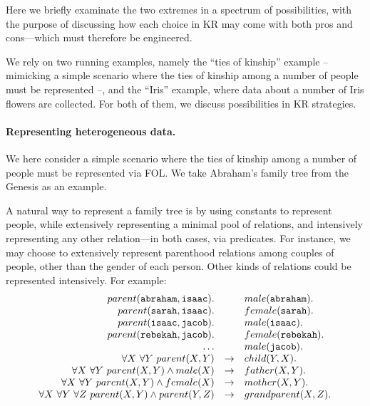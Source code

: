 \documentclass[12pt,a4paper,openright,twoside]{book}
\begin{document}
Here we briefly examinate the two extremes in a spectrum of possibilities, with the purpose of discussing how each choice in KR may come with both pros and cons---which must therefore be engineered.

We rely on two running examples, namely the ``ties of kinship'' example -- mimicking a simple scenario where the ties of kinship among a number of people must be represented --, and the ``Iris'' example, where data about a number of Iris flowers are collected.
%
For both of them, we discuss possibilities in KR strategies.

\paragraph{Representing heterogeneous data.}

We here consider a simple scenario where the ties of kinship among a number of people must be represented via FOL.
%
We take Abraham's family tree from the Genesis as an example.

A natural way to represent a family tree is by using constants to represent people, while extensively representing a minimal pool of relations, and intensively representing any other relation---in both cases, via predicates.
%
For instance, we may choose to extensively represent parenthood relations among couples of people, other than the gender of each person.
%
Other kinds of relations could be represented intensively.
%
For example:
%
\begin{equation}
    \begin{array}{rcl}
        parent(\mathtt{abraham}, \mathtt{isaac}). & {} & male(\mathtt{abraham}).
        \\
        parent(\mathtt{sarah}, \mathtt{isaac}). & {} & female(\mathtt{sarah}).
        \\
        parent(\mathtt{isaac}, \mathtt{jacob}). & {} & male(\mathtt{isaac}).
        \\
        parent(\mathtt{rebekah}, \mathtt{jacob}). & {} & female(\mathtt{rebekah}).
        \\
        \ldots & {} & male(\mathtt{jacob}).
        \\
        \forall X ~ \forall Y\ parent(X, Y) & \rightarrow & child(Y, X).  
        \\
        \forall X ~ \forall Y\ parent(X, Y) \wedge male(X) & \rightarrow & father(X, Y).  
        \\
        \forall X ~ \forall Y\ parent(X, Y) \wedge female(X) & \rightarrow & mother(X, Y).  
        \\
        \forall X ~ \forall Y ~ \forall Z \ parent(X, Y) \wedge parent(Y, Z) & \rightarrow & grandparent(X, Z).  
    \end{array}
\end{equation}
\end{document}
